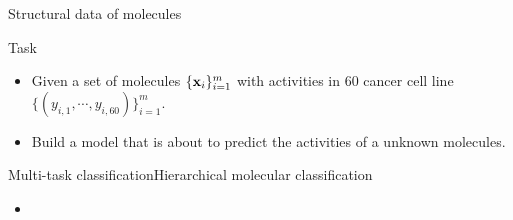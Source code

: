 \documentclass[first=dgreen,second=purple,logo=yellowexc]{aaltoslides}
\begin{document}
{\begin{frame}{Structural data of molecules}
\begin{itemize}
	\end{itemize}
\end{frame}

\begin{frame}{Task}
	\begin{itemize}
		\item Given a set of molecules $\{\mathbf {x}_i\}_{i=1}^m$ with activities in $60$ cancer cell line $\{(y_{i,1},\cdots,y_{i,60})\}_{i=1}^m$.
		\item Build a model that is about to predict the activities of a unknown molecules.
	\end{itemize}
\end{frame}


\begin{frame}{Multi-task classification}{Hierarchical molecular classification}
	\begin{itemize}
		\item 
	\end{itemize}
\end{frame}

}
\end{document}

